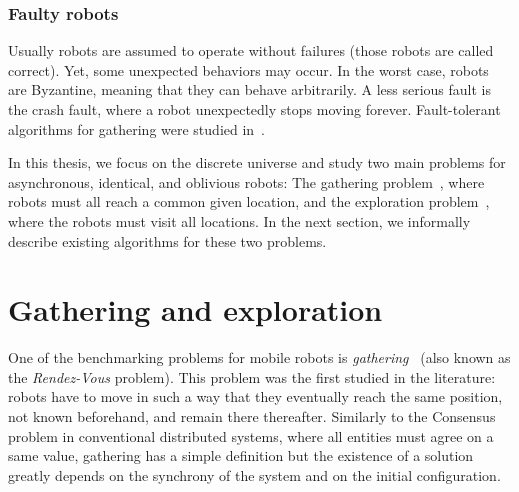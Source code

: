 



	
\subsubsection{Faulty robots}
Usually robots are assumed to operate without failures (those robots are called correct). Yet, some unexpected behaviors may occur. In the worst case, robots are Byzantine, meaning that they can behave arbitrarily. 
A less serious fault is the crash fault, where a robot unexpectedly stops moving forever.
Fault-tolerant algorithms for gathering were studied in~\cite{AgmonP06,DefagoGMP06,CourtieuRTU15}.	

\bigskip 
In this thesis, we focus on the discrete universe and study two main problems for asynchronous, identical, and oblivious robots: The gathering problem~\cite{KlasingMP06,klasing_taking_2008}, where robots must all reach a common given location, and the exploration problem~\cite{flocchini_computing_2007,devismes_optimal_2010-1}, where the robots must visit all locations. In the next section, we informally describe existing algorithms for these two problems. 

\section{Gathering and exploration}
One of the benchmarking problems for mobile robots is \emph{gathering}~\cite{markoubook} (also known as the \emph{Rendez-Vous} problem). This problem was the first studied in the literature: robots have to move in such a way that they eventually reach the same position, not known beforehand, and remain there thereafter. 
Similarly to the Consensus problem in conventional distributed systems, where all entities must agree on a same value, gathering has a simple definition but the existence of a solution greatly depends on the synchrony of the system and on the initial configuration. 


